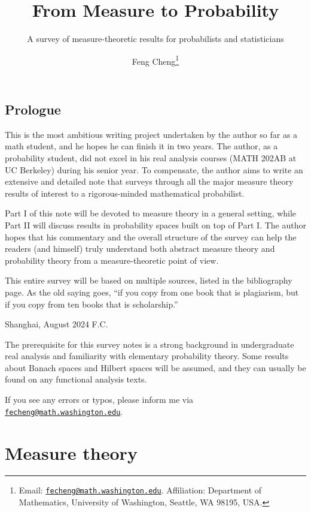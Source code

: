 \documentclass[10pt,oneside]{book}
\title{From Measure to Probability}
\subtitle{A survey of measure-theoretic results for probabilists and statisticians}
\author{Feng Cheng\thanks{Email: \href{mailto:fecheng@uw.edu}{\texttt{fecheng@math.washington.edu}}. Affiliation: Department of Mathematics, University of Washington, Seattle, WA 98195, USA.}}
\date{}
\makeatletter
\numberwithin{equation}{chapter}
\theoremstyle{plain-star}
\theoremstyle{definition-star}
\theoremstyle{remark-star}
\theoremstyle{plain-star}
\let\@subtitle\@empty %
\renewcommand{\maketitle}{%
    \begin{titlepage}
    \renewcommand\thefootnote{\@fnsymbol\c@footnote}
    \let\footnotesize\small
    \let\footnoterule\relax
    \let \footnote \thanks
    \null\vfil
    \vskip 60\p@
    \begin{center}%
        {\LARGE \@title \par}%
        \vskip .5em%
        {\large \@subtitle \par}%
        \vskip 3em%
        {\large
        \lineskip .75em%
        \begin{tabular}[t]{c}%
            \@author
        \end{tabular}\par}%
        \vskip 1.5em%
        {\large \@date \par}%
    \end{center}\par
    \@thanks
    \vfil\null
    \end{titlepage}%
    \setcounter{footnote}{0}%
    \global\let\thanks\relax
    \global\let\maketitle\relax
    \global\let\@thanks\@empty
    \global\let\@author\@empty
    \global\let\@date\@empty
    \global\let\@title\@empty
    \global\let\title\relax
    \global\let\author\relax
    \global\let\date\relax
    \global\let\and\relax
}
\makeatother
\begin{document}
\maketitle

\tableofcontents
\newpage

{}
\chapter*{\Large Prologue}

This is the most ambitious writing project undertaken by the author so far as a math student, and he hopes he can finish it in two years. The author, as a probability student, did not excel in his real analysis courses (MATH 202AB at UC Berkeley) during his senior year. To compensate, the author aims to write an extensive and detailed note that surveys through all the major measure theory results of interest to a rigorous-minded mathematical probabilist.

Part I of this note will be devoted to measure theory in a general setting, while Part II will discuss results in probability spaces built on top of Part I. The author hopes that his commentary and the overall structure of the survey can help the readers (and himself) truly understand both abstract measure theory and probability theory from a measure-theoretic point of view.

This entire survey will be based on multiple sources, listed in the bibliography page. As the old saying goes, ``if you copy from one book that is plagiarism, but if you copy from ten books that is scholarship.''
\vspace{1\baselineskip}

\noindent Shanghai, August 2024 \hfill F.C.

\vspace{3\baselineskip}
The prerequisite for this survey notes is a strong background in undergraduate real analysis and familiarity with elementary probability theory. Some results about Banach spaces and Hilbert spaces will be assumed, and they can usually be found on any functional analysis texts.

If you see any errors or typos, please inform me via \href{mailto:fecheng@uw.edu}{\texttt{fecheng@math.washington.edu}}.
\newpage

\part{Measure theory}
\end{document}
